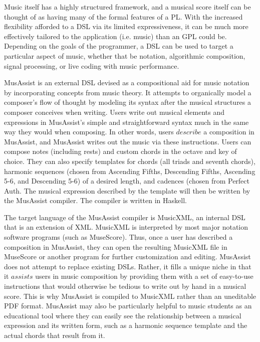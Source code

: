 \documentclass{report}
\begin{document}
Music itself has a highly structured framework, and a musical score itself can be thought of as having many of the formal features of a PL. With the increased flexibility afforded to  a DSL via its limited expressiveness, it can be much  more effectively tailored to the application (i.e. music) than an GPL could be. Depending on the goals of the programmer, a DSL can be used to target a particular aspect of music, whether that be notation, algorithmic composition, signal processing, or live coding with music performance. 

MusAssist is an external DSL devised as a compositional aid for music notation by incorporating concepts from music theory. It attempts to organically model a composer's flow of thought by modeling its syntax after the musical structures a composer conceives when writing. Users write out musical elements and expressions in MusAssist's simple and straightforward syntax much in the same way they would when composing. In other words, users $describe$ a composition in MusAssist, and MusAssist writes out the music via these instructions. Users can compose notes (including rests) and custom chords in the octave and key of choice. They can also specify templates for chords (all triads and seventh chords), harmonic sequences (chosen from Ascending Fifths, Descending Fifths, Ascending 5-6, and Descending 5-6) of a desired length, and cadences (chosen from Perfect Auth. The musical expression described by the template will then be written by the MusAssist compiler. The compiler is written in Haskell.

The target language of the MusAssist compiler is MusicXML, an internal DSL that is an extension of XML. MusicXML is interpreted by most major notation software programs (such as MuseScore). Thus, once a user has described a composition in MusAssist, they can open the resulting MusicXML file in MuseScore or another program for further customization and editing. MusAssist does not attempt to replace existing DSLs. Rather, it fills a unique niche in that it $assists$ users in music composition by providing them with a set of easy-to-use instructions that would otherwise be tedious to write out by hand in a musical score. This is why MusAssist is compiled to MusicXML rather than an uneditable PDF format. MusAssist may also be particularly helpful to music students as an educational tool where they can easily see the relationship between a musical expression and its written form, such as a harmonic sequence template and the actual chords that result from it.
\end{document}
